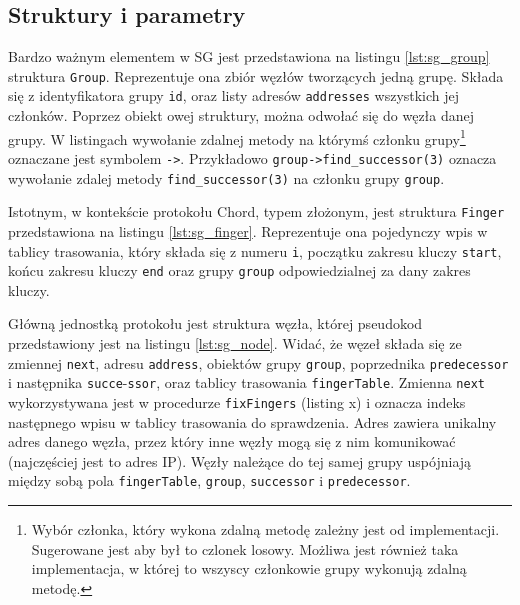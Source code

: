 \documentclass[12pt, twoside, openany]{report}
\begin{document}
\subsection{Struktury i parametry}

Bardzo ważnym elementem w SG jest przedstawiona na listingu \ref{lst:sg_group} struktura \texttt{Group}. Reprezentuje ona zbiór węzłów tworzących jedną grupę. Składa się z identyfikatora grupy \texttt{id}, oraz listy adresów \texttt{addresses} wszystkich jej członków. Poprzez obiekt owej struktury, można odwołać się do węzła danej grupy. W listingach wywołanie zdalnej metody na którymś członku grupy\footnote{Wybór członka, który wykona zdalną metodę zależny jest od implementacji. Sugerowane jest aby był to czlonek losowy. Możliwa jest również taka implementacja, w której to wszyscy członkowie grupy wykonują zdalną metodę.} oznaczane jest symbolem \texttt{->}. Przykładowo \texttt{group->find\_successor(3)} oznacza wywołanie zdalej metody \texttt{find\_successor(3)} na członku grupy \texttt{group}.

Istotnym, w kontekście protokołu Chord, typem złożonym, jest struktura \texttt{Finger} przedstawiona na listingu \ref{lst:sg_finger}. Reprezentuje ona pojedynczy wpis w tablicy trasowania, który składa się z numeru \texttt{i}, początku zakresu kluczy \texttt{start}, końcu zakresu kluczy \texttt{end} oraz grupy \texttt{group} odpowiedzialnej za dany zakres kluczy.







Główną jednostką protokołu jest struktura węzła, której pseudokod przedstawiony jest na listingu \ref{lst:sg_node}. Widać, że węzeł składa się ze zmiennej \texttt{next}, adresu \texttt{address}, obiektów grupy \texttt{group}, poprzednika \texttt{predecessor} i następnika \texttt{succe}-\texttt{ssor}, oraz tablicy trasowania \texttt{fingerTable}. Zmienna \texttt{next} wykorzystywana jest w procedurze \texttt{fixFingers} (listing x) i oznacza indeks następnego wpisu w tablicy trasowania do sprawdzenia. Adres zawiera unikalny adres danego węzła, przez który inne węzły mogą się z nim komunikować (najczęściej jest to adres IP). Węzły należące do tej samej grupy uspójniają między sobą pola \texttt{fingerTable}, \texttt{group}, \texttt{successor} i \texttt{predecessor}.
\end{document}
